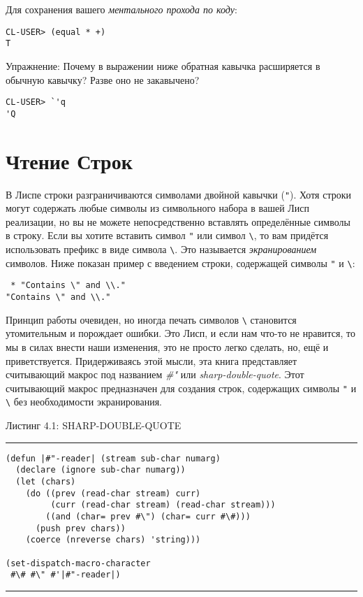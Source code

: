 Для сохранения вашего \emph{ментального прохода по коду}:

\begin{verbatim}
CL-USER> (equal * +)
T
\end{verbatim}

Упражнение: Почему в выражении ниже обратная кавычка расширяется в обычную кавычку? Разве оно не закавычено?

\begin{verbatim}
CL-USER> `'q
'Q
\end{verbatim}

\section{Чтение Строк}\label{section_reading_strings}

В Лиспе строки разграничиваются символами двойной кавычки (\verb|"|). Хотя строки могут содержать любые символы из символьного набора в вашей Лисп реализации, но вы не можете непосредственно вставлять определённые символы в строку. Если вы хотите вставить символ \verb|"| или символ \verb"\", то вам придётся использовать префикс в виде символа \verb"\". Это называется \emph{экранированием} символов. Ниже показан пример с введением строки, содержащей символы \verb|"| и \verb"\":

\begin{verbatim}
 * "Contains \" and \\."
"Contains \" and \\."
\end{verbatim}

Принцип работы очевиден, но иногда печать символов \verb"\" становится утомительным и порождает ошибки. Это Лисп, и если нам что-то не нравится, то мы в силах внести наши изменения, это не просто легко сделать, но, ещё и приветствуется. Придерживаясь этой мысли, эта книга представляет считывающий макрос под названием \emph{\#"} или \emph{sharp-double-quote}. Этот считывающий макрос предназначен для создания строк, содержащих символы \verb|"| и \verb"\" без необходимости экранирования.

Листинг 4.1: SHARP-DOUBLE-QUOTE\label{listing_4.1}
\hrule
\begin{verbatim}
(defun |#"-reader| (stream sub-char numarg)
  (declare (ignore sub-char numarg))
  (let (chars)
    (do ((prev (read-char stream) curr)
         (curr (read-char stream) (read-char stream)))
        ((and (char= prev #\") (char= curr #\#)))
      (push prev chars))
    (coerce (nreverse chars) 'string)))

(set-dispatch-macro-character
 #\# #\" #'|#"-reader|)
\end{verbatim}
\hrule


